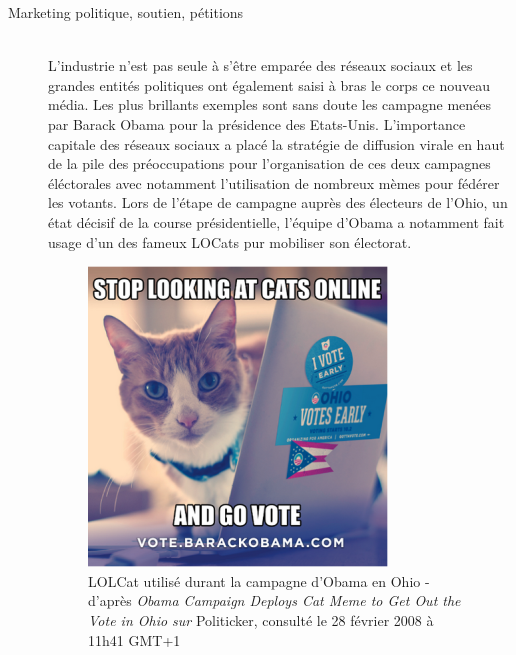 \begin{description}
\item[Marketing politique, soutien, p\'etitions]
\hfill \\
L{\textquoteright}industrie n{\textquoteright}est pas seule \`a s{\textquoteright}\^etre empar\'ee des r\'eseaux sociaux et les grandes entit\'es politiques ont \'egalement saisi \`a bras le corps ce nouveau m\'edia. Les plus brillants exemples sont sans doute les campagne men\'ees par Barack Obama pour la pr\'esidence des Etats-Unis. L{\textquoteright}importance capitale des r\'eseaux sociaux a plac\'e la strat\'egie de diffusion virale en haut de la pile des pr\'eoccupations pour l{\textquoteright}organisation de ces deux campagnes \'el\'ectorales \citep{Miller2008} avec notamment l{\textquoteright}utilisation de nombreux m\`emes pour f\'ed\'erer les votants. Lors de l{\textquoteright}\'etape de campagne aupr\`es des \'electeurs de l{\textquoteright}Ohio, un \'etat d\'ecisif de la course pr\'esidentielle, l{\textquoteright}\'equipe d{\textquoteright}Obama a notamment fait usage d{\textquoteright}un des fameux LOCats pur mobiliser son \'electorat. 


\begin{figure}[ht]
    \centering
    \includegraphics[scale=0.8]{figures/chap2/chapitre2-img16.png}
    \caption[Lolcat utilisé lors la campagne d'Obama]{ 
        LOLCat utilis\'e durant la campagne d{\textquoteright}Obama en Ohio - d{\textquoteright}apr\`es \textit{Obama Campaign Deploys Cat Meme to Get Out the Vote in Ohio sur }Politicker, consult\'e le 28 f\'evrier 2008 \`a 11h41 GMT+1
    } 
    \label{fig:obama-cat}
\end{figure}


\end{description}
